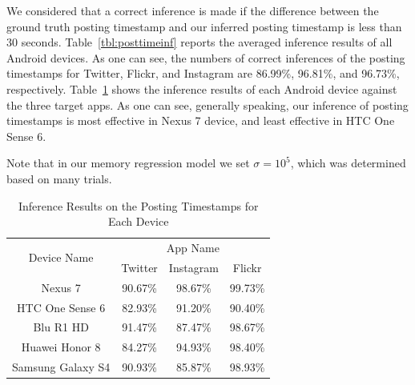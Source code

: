 \documentclass[letterpaper,12pt]{article}
\begin{document}
We considered that a correct inference is made if the difference between the ground truth posting timestamp and our inferred posting timestamp is less than 30 seconds. 
Table~\ref{tbl:posttimeinf} reports the averaged inference results of all Android devices. As one can see, the numbers of correct inferences of the posting timestamps for Twitter, Flickr, and Instagram are 86.99\%, 96.81\%, and 96.73\%, respectively. Table~\ref{tbl:eachdeviceinfer} shows the inference results of each Android device against the three target apps. As one can see, generally speaking, our inference of posting timestamps is most effective in Nexus 7 device, and least effective in HTC One Sense 6.

Note that in our memory regression model we set $\sigma=10^5$, which was determined based on many trials. 

\begin{table}[]
\centering
\caption{Inference Results on the Posting Timestamps for Each Device}
\label{tbl:eachdeviceinfer}
\begin{tabular}{|c|c|c|c|}
\hline
\multirow{2}{*}{Device Name} & \multicolumn{3}{c|}{App Name} \\ \cline{2-4} 
                             & Twitter & Instagram & Flickr  \\ \hline
Nexus 7                      & 90.67\% & 98.67\%   & 99.73\% \\ \hline
HTC One Sense 6              & 82.93\% & 91.20\%   & 90.40\% \\ \hline
Blu R1 HD                    & 91.47\% & 87.47\%   & 98.67\% \\ \hline
Huawei Honor 8               & 84.27\% & 94.93\%   & 98.40\% \\ \hline
Samsung Galaxy S4            & 90.93\% & 85.87\%   & 98.93\% \\ \hline
\end{tabular}
\end{table}
\end{document}
